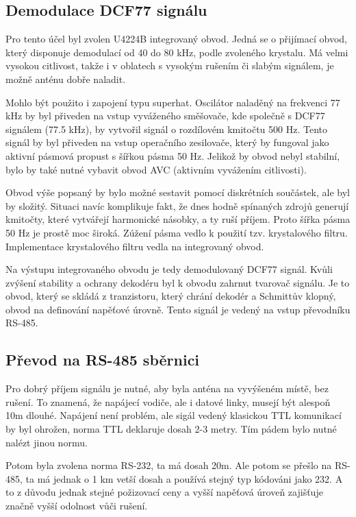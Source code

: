 \subsection{Demodulace DCF77 signálu}
    Pro tento účel byl zvolen U4224B integrovaný obvod. Jedná se o přijímací obvod, který
    disponuje demodulací od 40 do 80 kHz, podle zvoleného krystalu. Má velmi vysokou
    citlivost, takže i v oblatech s vysokým rušením či slabým signálem, je možně anténu
    dobře naladit.

    Mohlo být použito i zapojení typu superhat. Oscilátor naladěný na frekvenci 77 kHz by
    byl přiveden na vstup vyváženého směšovače, kde společně s DCF77 signálem (77.5 kHz),
    by vytvořil signál o rozdílovém kmitočtu 500 Hz. Tento signál by byl přiveden na
    vstup operačního zesilovače, který by fungoval jako aktivní pásmová propust s šířkou
    pásma 50 Hz. Jelikož by obvod nebyl stabilní, bylo by také nutné vybavit obvod AVC
    (aktivním vyvážením citlivosti).

    Obvod výše popsaný by bylo možné sestavit pomocí diskrétních součástek, ale byl by
    složitý. Situaci navíc komplikuje fakt, že dnes hodně spínaných zdrojů generují
    kmitočty, které vytvářejí harmonické násobky, a ty ruší příjem. Proto šířka pásma 50
    Hz je prostě moc široká. Zúžení pásma vedlo k použití tzv. krystalového filtru.
    Implementace krystalového filtru vedla na integrovaný obvod.

    Na výstupu integrovaného obvodu je tedy demodulovaný DCF77 signál. Kvůli zvýšení
    stability a ochrany dekodéru byl k obvodu zahrnut tvarovač signálu. Je to obvod, který
    se skládá z tranzistoru, který chrání dekodér a Schmittův klopný, obvod na definování
    napěťové úrovně. Tento signál je vedený na vstup převodníku RS-485.

\subsection{Převod na RS-485 sběrnici}
    Pro dobrý příjem signálu je nutné, aby byla anténa na vyvýšeném místě, bez rušení.
    To znamená, že napájecí vodiče, ale i datové linky, musejí být alespoň 10m dlouhé.
    Napájení není problém, ale sigál vedený klasickou TTL komunikací by byl ohrožen,
    norma TTL deklaruje dosah 2-3 metry. Tím pádem bylo nutné nalézt jinou normu.

    Potom byla zvolena norma RS-232, ta má dosah 20m. Ale potom se přešlo na RS-485, ta má
    jednak o 1 km vetší dosah a používá stejný typ kódováni jako 232. A to z důvodu jednak
    stejné požizovací ceny a vyšší napěťová úroveň zajišťuje značně vyšší odolnost vůči
    rušení.

